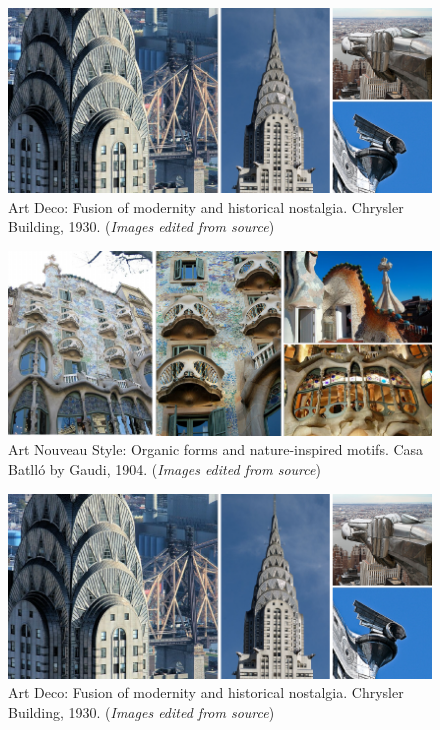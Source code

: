     \begin{figure}[htb]
    \centering
    \includegraphics[width= \linewidth]{Images/ArtDecoFacade}
    \caption{Art Deco: Fusion of modernity and historical nostalgia. Chrysler Building, 1930. (\textit{Images edited from source})}
    \label{fig:ArtDeco}
    \end{figure}

    \begin{figure}[hb]
    \centering
    \includegraphics[width= \linewidth]{Images/ArtnouveauGaudi}
    \caption{Art Nouveau Style: Organic forms and nature-inspired motifs. Casa Batlló by Gaudi, 1904. (\textit{Images edited from source})}
    \label{fig:ArtNouveaustyle}
    \end{figure}

    \begin{figure}[hb]
    \centering
    \includegraphics[width= \linewidth]{Images/ArtDecoFacade}
    \caption{Art Deco: Fusion of modernity and historical nostalgia. Chrysler Building, 1930. (\textit{Images edited from source})}
    \label{fig:ArtDeco}
    \end{figure}

